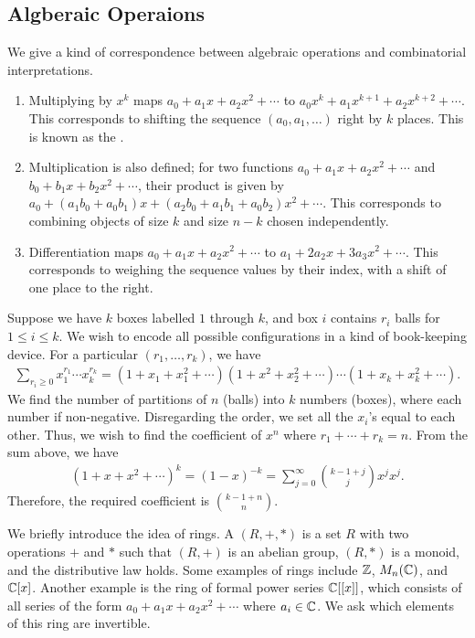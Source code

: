 \subsection{Algberaic Operaions}
We give a kind of correspondence between algebraic operations and combinatorial interpretations.
\begin{enumerate}
    \item Multiplying by $x^{k}$ maps $a_{0}+a_{1}x+a_{2}x^{2}+\cdots$ to $a_{0}x^{k}+a_{1}x^{k+1}+a_{2}x^{k+2}+\cdots$. This corresponds to shifting the sequence $(a_{0},a_{1},\ldots)$ right by $k$ places. This is known as the .
    \item Multiplication is also defined; for two functions $a_{0}+a_{1}x+a_{2}x^{2}+\cdots$ and $b_{0}+b_{1}x+b_{2}x^{2}+\cdots$, their product is given by $a_{0}+(a_{1}b_{0}+a_{0}b_{1})x+(a_{2}b_{0}+a_{1}b_{1}+a_{0}b_{2})x^{2}+\cdots$. This corresponds to combining objects of size $k$ and size $n-k$ chosen independently.
    \item Differentiation maps $a_{0}+a_{1}x+a_{2}x^{2}+\cdots$ to $a_{1}+2a_{2}x+3a_{3}x^{2}+\cdots$. This corresponds to weighing the sequence values by their index, with a shift of one place to the right.
\end{enumerate}

\begin{example}
    Suppose we have $k$ boxes labelled $1$ through $k$, and box $i$ contains $r_{i}$ balls for $1 \leq i \leq k$. We wish to encode all possible configurations in a kind of book-keeping device. For a particular $(r_{1},\ldots,r_{k})$, we have
    \begin{align}
        \sum_{r_{i}\geq 0} x_{1}^{r_{1}} \cdots x_{k}^{r_{k}} = (1+x_{1}+x_{1}^{2}+\cdots)(1+x^{2}+x_{2}^{2}+\cdots)\cdots(1+x_{k}+x_{k}^{2}+\cdots).
    \end{align}
    We find the number of partitions of $n$ (balls) into $k$ numbers (boxes), where each number if non-negative. Disregarding the order, we set all the $x_{i}$'s equal to each other. Thus, we wish to find the coefficient of $x^{n}$ where $r_{1}+\cdots+r_{k} = n$. From the sum above, we have
    \begin{align}
        (1+x+x^{2}+\cdots)^{k} = (1-x)^{-k} = \sum_{j=0}^{\infty} \binom{k-1+j}{j} x^{j} x^{j}.
    \end{align}
    Therefore, the required coefficient is $\binom{k-1+n}{n}$.
\end{example}

We briefly introduce the idea of rings. A  $(R,+,\ast)$ is a set $R$ with two operations $+$ and $\ast$ such that $(R,+)$ is an abelian group, $(R,\ast)$ is a monoid, and the distributive law holds. Some examples of rings include $\mathbb{Z}$, $M_{n}(\mathbb{C})$, and $\mathbb{C}[x]$. Another example is the ring of formal power series $\mathbb{C}[[x]]$, which consists of all series of the form $a_{0}+a_{1}x+a_{2}x^{2}+\cdots$ where $a_{i} \in \mathbb{C}$. We ask which elements of this ring are invertible.

